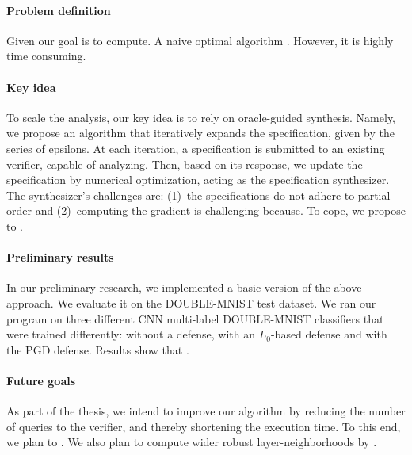 \paragraph{Problem definition} Given  our goal is to compute. A naive optimal algorithm . However, it is highly time consuming.

\paragraph{Key idea} To scale the analysis, our key idea is to rely on oracle-guided synthesis. Namely, we propose an algorithm that iteratively expands the specification, given by the series of epsilons. At each iteration, a specification is submitted to an existing verifier, capable of analyzing. Then, based on its response, we update the specification by numerical optimization, acting as the specification synthesizer.
The synthesizer's challenges are: (1)~the specifications do not adhere to partial order and (2)~computing the gradient is challenging because. To cope, we propose to .

\paragraph{Preliminary results}
In our preliminary research, we implemented a basic version of the above approach. We evaluate it on the DOUBLE-MNIST test dataset.
We ran our program on three different CNN multi-label DOUBLE-MNIST classifiers that were trained differently: without a defense, with an $L_0$-based defense and with the PGD defense.
Results show that .
\paragraph{Future goals}
As part of the thesis, we intend to improve our algorithm by reducing the number of queries to the verifier, and thereby shortening the execution time. To this end, we plan to .
We also plan to compute wider robust layer-neighborhoods by .

